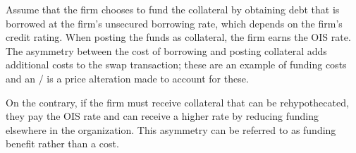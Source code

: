 \documentclass[main.tex]{subfiles}
\begin{document}
            Assume that the firm chooses to fund the collateral by obtaining debt
            that is borrowed at the firm's unsecured borrowing rate, which depends on the firm's credit rating.
            When posting the funds as collateral, the firm earns the OIS rate.
            The asymmetry between the cost of borrowing and posting collateral
            adds additional costs to the swap transaction; 
            these are an example of funding costs and an \FVA/ is a price alteration made to account for these.

            On the contrary, if the firm must receive collateral that can be rehypothecated,
            they pay the OIS rate and can receive a higher rate
            by reducing funding elsewhere in the organization.
            This asymmetry can be referred to as funding benefit rather than a cost.
\end{document}

